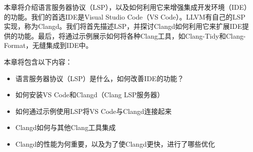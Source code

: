 本章将介绍语言服务器协议（LSP），以及如何利用它来增强集成开发环境（IDE）的功能。我们的首选IDE是Visual Studio Code（VS Code）。LLVM有自己的LSP实现，称为Clangd。我们将首先描述LSP，并探讨Clangd如何利用它来扩展IDE提供的功能。最后，将通过示例展示如何将各种Clang工具，如Clang-Tidy和Clang-Format，无缝集成到IDE中。

本章将包含以下内容：

\begin{itemize}
\item
语言服务器协议（LSP）是什么，如何改善IDE的功能？

\item
如何安装VS Code和Clangd（Clang LSP服务器）

\item
如何通过示例使用LSP将VS Code与Clangd连接起来

\item
Clangd如何与其他Clang工具集成

\item
Clangd的性能为何重要，以及为了使Clangd更快，进行了哪些优化
\end{itemize}

